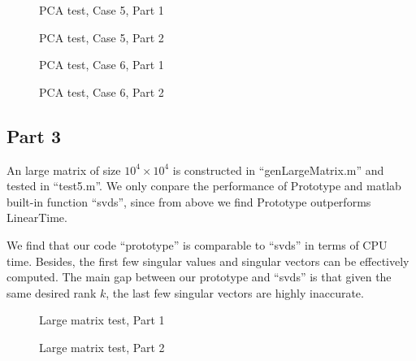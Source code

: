 \documentclass[conference,onecolumn,12pt]{IEEEtran}
\numberwithin{equation}{section}
\numberwithin{figure}{section}
\numberwithin{table}{section}
\theoremstyle{definition}
\begin{document}
\begin{figure}[H]
  \centering
  \caption{PCA test, Case 5, Part 1}
\end{figure}

\begin{figure}[H]
  \centering
  \caption{PCA test, Case 5, Part 2}
\end{figure}

\begin{figure}[H]
  \centering
  \caption{PCA test, Case 6, Part 1}
\end{figure}

\begin{figure}[H]
  \centering
  \caption{PCA test, Case 6, Part 2}
\end{figure}


\clearpage
\subsection{Part 3}
An large matrix of size $10^4\times 10^4$ is constructed in ``genLargeMatrix.m'' and tested in ``test5.m''. We only conpare the performance of Prototype and matlab built-in function ``svds'', since from above we find Prototype outperforms LinearTime.

We find that our code ``prototype'' is comparable to ``svds'' in terms of CPU time. Besides, the first few singular values and singular vectors can be effectively computed. The main gap between our prototype and ``svds'' is that given the same desired rank $k$, the last few singular vectors are highly inaccurate.
\begin{figure}[H]
  \centering
  \caption{Large matrix test,  Part 1}
\end{figure}

\begin{figure}[H]
  \centering
  \caption{Large matrix test, Part 2}
\end{figure}
\end{document}

